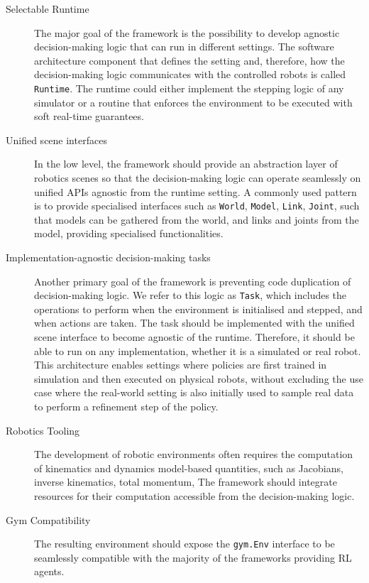 \begin{description}
%
\item[Selectable Runtime]
The major goal of the framework is the possibility to develop agnostic decision-making logic that can run in different settings.
The software architecture component that defines the setting and, therefore, how the decision-making logic communicates with the controlled robots is called \verb|Runtime|.
The runtime could either implement the stepping logic of any simulator or a routine that enforces the environment to be executed with soft real-time guarantees.
%
\item[Unified scene interfaces]
In the low level, the framework should provide an abstraction layer of robotics scenes so that the decision-making logic can operate seamlessly on unified \acp{API} agnostic from the runtime setting.
A commonly used pattern is to provide specialised interfaces such as \verb|World|, \verb|Model|, \verb|Link|, \verb|Joint|, \etc such that models can be gathered from the world, and links and joints from the model, providing specialised functionalities.
%
\item[Implementation-agnostic decision-making tasks]
Another primary goal of the framework is preventing code duplication of decision-making logic.
We refer to this logic as \verb|Task|, which includes the operations to perform when the environment is initialised and stepped, and when actions are taken.
The task should be implemented with the unified scene interface to become agnostic of the runtime.
Therefore, it should be able to run on any implementation, whether it is a simulated or real robot.
This architecture enables settings where policies are first trained in simulation and then executed on physical robots, without excluding the use case where the real-world setting is also initially used to sample real data to perform a refinement step of the policy.
%
\item[Robotics Tooling]
The development of robotic environments often requires the computation of kinematics and dynamics model-based quantities, such as Jacobians, inverse kinematics, total momentum, \etc The framework should integrate resources for their computation accessible from the decision-making logic.
%
\item[Gym Compatibility]
The resulting environment should expose the \verb|gym.Env| interface to be seamlessly compatible with the majority of the frameworks providing \ac{RL} agents.
%
\end{description}

